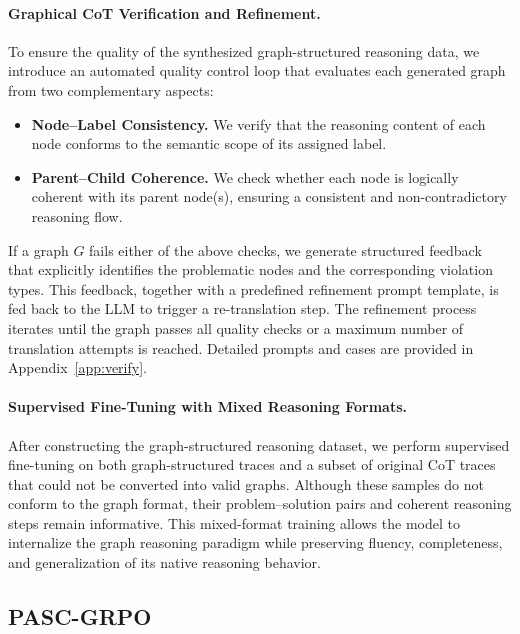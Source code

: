 \paragraph{Graphical CoT Verification and Refinement.}
To ensure the quality of the synthesized graph-structured reasoning data, we introduce an automated quality control loop that evaluates each generated graph from two complementary aspects:

\begin{itemize}
    \item \textbf{Node--Label Consistency.}
    We verify that the reasoning content of each node conforms to the semantic scope of its assigned label.

    \item \textbf{Parent--Child Coherence.}
    We check whether each node is logically coherent with its parent node(s), ensuring a consistent and non-contradictory reasoning flow.
\end{itemize}

If a graph $G$ fails either of the above checks, we generate structured feedback that explicitly identifies the problematic nodes and the corresponding violation types.
This feedback, together with a predefined refinement prompt template, is fed back to the LLM to trigger a re-translation step.
The refinement process iterates until the graph passes all quality checks or a maximum number of translation attempts is reached. 
Detailed prompts and cases are provided in Appendix~\ref{app:verify}.

\paragraph{Supervised Fine-Tuning with Mixed Reasoning Formats.}  
After constructing the graph-structured reasoning dataset, we perform supervised fine-tuning on both graph-structured traces and a subset of original CoT traces that could not be converted into valid graphs. Although these samples do not conform to the graph format, their problem–solution pairs and coherent reasoning steps remain informative. This mixed-format training allows the model to internalize the graph reasoning paradigm while preserving fluency, completeness, and generalization of its native reasoning behavior.


\subsection{PASC-GRPO}
\label{sec:pasc_grpo}

